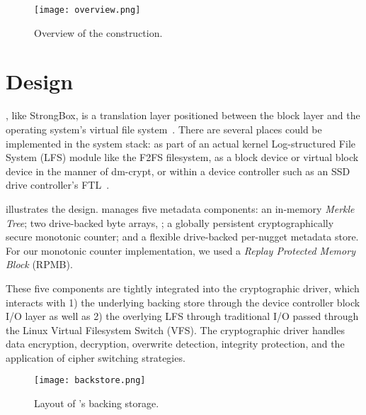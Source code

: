 \begin{figure}[t]
 \centering
  \texttt{[image: overview.png]}
   \caption{Overview of the \SYSTEM{} construction.}\label{fig:overview}
\end{figure}

\section{\SYSTEM{} Design}\label{sec:design}


\SYSTEM{}, like StrongBox, is a translation layer positioned between the block
layer and the operating system's virtual file system~\cite{StrongBox}. There are
several places \SYSTEM{} could be implemented in the system stack: as part of an
actual kernel Log-structured File System (LFS) module like the F2FS filesystem,
as a block device or virtual block device in the manner of dm-crypt, or within a
device controller such as an SSD drive controller's FTL~\cite{StrongBox}.

 illustrates the \SYSTEM{} design. \SYSTEM{} manages five
metadata components: an in-memory \emph{Merkle Tree}; two drive-backed byte
arrays, ; a
globally persistent cryptographically secure monotonic counter; and a flexible
drive-backed per-nugget metadata store. For our monotonic counter
implementation, we used a \emph{Replay Protected Memory Block} (RPMB).

These five components are tightly integrated into the cryptographic driver,
which interacts with 1) the underlying backing store through the device
controller block I/O layer as well as 2) the overlying LFS through traditional
I/O passed through the Linux Virtual Filesystem Switch (VFS). The cryptographic
driver handles data encryption, decryption, overwrite detection, integrity
protection, and the application of cipher switching strategies.


\begin{figure}[t]
 \centering
  \texttt{[image: backstore.png]}
   \caption{Layout of \SYSTEM{}'s backing storage.}\label{fig:backstore}
\end{figure}
